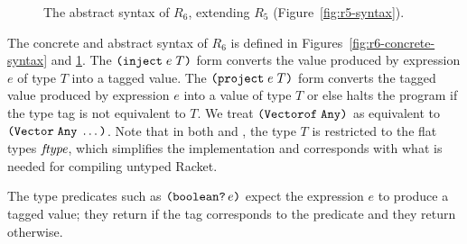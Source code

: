 \documentclass[11pt]{book}
\newcommand{\gray}[1]{{\color{gray} #1}}
\begin{document}
\begin{figure}[tp]
\centering
\fbox{
  \begin{minipage}{0.96\textwidth}
    \small
\[
\begin{array}{lcl}
  \itm{op} &::= & \code{boolean?} \mid \code{integer?} \mid \code{vector?}
    \mid \code{procedure?} \mid \code{void?} \\
  \Exp &::=& \gray{ \INT{\Int} \VAR{\Var} \mid \LET{\Var}{\Exp}{\Exp} } \\
       &\mid& \gray{ \PRIM{\itm{op}}{\Exp\ldots} }\\
     &\mid& \gray{ \BOOL{\itm{bool}}
      \mid \IF{\Exp}{\Exp}{\Exp} } \\
     &\mid& \gray{ \VOID{} \mid \LP\key{HasType}~\Exp~\Type \RP 
     \mid \APPLY{\Exp}{\Exp\ldots} }\\
  &\mid& \gray{ \LAMBDA{\LP[\Var\code{:}\Type]\ldots\RP}{\Type}{\Exp} }\\
   &\mid& \INJECT{\Exp}{\FType} \mid \PROJECT{\Exp}{\FType} \\
 \Def &::=& \gray{ \FUNDEF{\Var}{\LP[\Var \code{:} \Type]\ldots\RP}{\Type}{\code{'()}}{\Exp} }\\
  R_5 &::=& \gray{ \PROGRAMDEFSEXP{\code{'()}}{\LP\Def\ldots\RP}{\Exp} }
\end{array}
\]
\end{minipage}
}
\caption{The abstract syntax of $R_6$, extending $R_5$ (Figure~\ref{fig:r5-syntax}).}
\label{fig:r6-syntax}
\end{figure}


The concrete and abstract syntax of $R_6$ is defined in
Figures~\ref{fig:r6-concrete-syntax} and \ref{fig:r6-syntax}.  The
$\texttt{(}\texttt{inject}\; e\; T\texttt{)}$ form converts the value produced by
expression $e$ of type $T$ into a tagged value.  The
$\texttt{(}\texttt{project}\;e\;T\texttt{)}$ form converts the tagged value produced by
expression $e$ into a value of type $T$ or else halts the program if
the type tag is not equivalent to $T$. We treat
$\texttt{(}\texttt{Vectorof}\;\texttt{Any}\texttt{)}$ as equivalent to
$\texttt{(}\texttt{Vector}\;\texttt{Any}\;\ldots\texttt{)}$.
%
Note that in both  and , the type $T$ is
restricted to the flat types $\mathit{ftype}$, which simplifies the
implementation and corresponds with what is needed for compiling
untyped Racket.

The type predicates such as $\texttt{(}\texttt{boolean?}\,e\texttt{)}$ expect the
expression $e$ to produce a tagged value; they return  if the
tag corresponds to the predicate and they return  otherwise.
\end{document}
